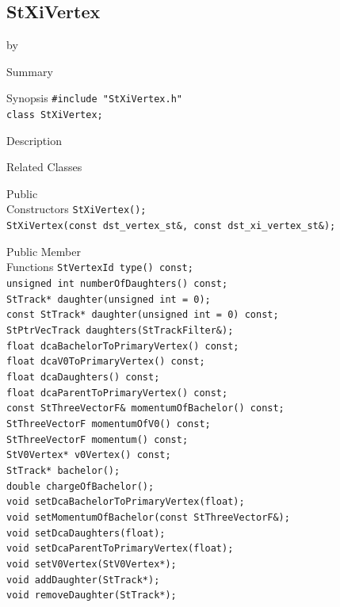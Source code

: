 \documentclass[twoside]{article}
\newcommand{\entrylabel}[1]{\mbox{\textbf{{#1}}}\hfil}%
\newenvironment{entry}
{\begin{list}{}%
    {\renewcommand{\makelabel}{\entrylabel}%
     \setlength{\labelwidth}{90pt}%
     \setlength{\leftmargin}{\labelwidth}
     \advance\leftmargin by \labelsep%
      }%
    }%
  {\end{list}}
\newcommand{\Entrylabel}[1]%
{\raisebox{0pt}[1ex][0pt]{\makebox[\labelwidth][l]%
    {\parbox[t]{\labelwidth}{\hspace{0pt}\textbf{{#1}}}}}}
\newenvironment{Entry}%
{\renewcommand{\entrylabel}{\Entrylabel}\begin{entry}}%
  {\end{entry}}
\begin{document}
\subsection{StXiVertex}
\label{sec:StXiVertex}
\begin{Entry}
\item[Summary]
\item[Synopsis]
    \verb+#include "StXiVertex.h"+\\
    \verb+class StXiVertex;+\\
\item[Description]
\item[Related Classes]
\item[Public\\ Constructors]
    \verb+StXiVertex();+\\
    \verb+StXiVertex(const dst_vertex_st&, const dst_xi_vertex_st&);+\\
\item[Public Member\\ Functions]
    \verb+StVertexId type() const;+\\
    \verb+unsigned int numberOfDaughters() const;+\\
    \verb+StTrack* daughter(unsigned int = 0);+\\
    \verb+const StTrack* daughter(unsigned int = 0) const;+\\
    \verb+StPtrVecTrack daughters(StTrackFilter&);+\\
    \verb+float dcaBachelorToPrimaryVertex() const;+\\
    \verb+float dcaV0ToPrimaryVertex() const;+\\
    \verb+float dcaDaughters() const;+\\
    \verb+float dcaParentToPrimaryVertex() const;+\\
    \verb+const StThreeVectorF& momentumOfBachelor() const;+\\
    \verb+StThreeVectorF momentumOfV0() const;+\\
    \verb+StThreeVectorF momentum() const;+\\
    \verb+StV0Vertex* v0Vertex() const;+\\
    \verb+StTrack* bachelor();+\\
    \verb+double chargeOfBachelor();+\\
    \verb+void setDcaBachelorToPrimaryVertex(float);+\\
    \verb+void setMomentumOfBachelor(const StThreeVectorF&);+\\
    \verb+void setDcaDaughters(float);+\\
    \verb+void setDcaParentToPrimaryVertex(float);+\\
    \verb+void setV0Vertex(StV0Vertex*);+\\
    \verb+void addDaughter(StTrack*);+\\
    \verb+void removeDaughter(StTrack*);+\\
\end{Entry}
\clearpage
\end{document}
